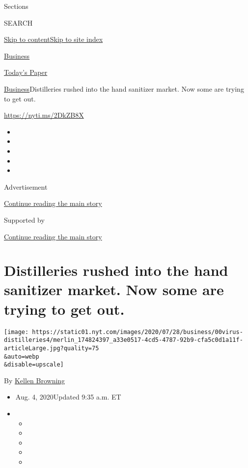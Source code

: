 Sections

SEARCH

\protect\hyperlink{site-content}{Skip to
content}\protect\hyperlink{site-index}{Skip to site index}

\href{https://www.nytimes.com/section/business}{Business}

\href{https://myaccount.nytimes.com/auth/login?response_type=cookie\&client_id=vi}{}

\href{https://www.nytimes.com/section/todayspaper}{Today's Paper}

\href{/section/business}{Business}\textbar{}Distilleries rushed into the
hand sanitizer market. Now some are trying to get out.

\url{https://nyti.ms/2DkZB8X}

\begin{itemize}
\item
\item
\item
\item
\item
\end{itemize}

Advertisement

\protect\hyperlink{after-top}{Continue reading the main story}

Supported by

\protect\hyperlink{after-sponsor}{Continue reading the main story}

\hypertarget{distilleries-rushed-into-the-hand-sanitizer-market-now-some-are-trying-to-get-out}{%
\section{Distilleries rushed into the hand sanitizer market. Now some
are trying to get
out.}\label{distilleries-rushed-into-the-hand-sanitizer-market-now-some-are-trying-to-get-out}}

\texttt{[image: https://static01.nyt.com/images/2020/07/28/business/00virus-distilleries4/merlin\_174824397\_a33e0517-4cd5-4787-92b9-cfa5c0d1a11f-articleLarge.jpg?quality=75\\\&auto=webp\\\&disable=upscale]}

By \href{https://www.nytimes.com/by/kellen-browning}{Kellen Browning}

\begin{itemize}
\item
  Aug. 4, 2020Updated 9:35 a.m. ET
\item
  \begin{itemize}
  \item
  \item
  \item
  \item
  \item
  \end{itemize}
\end{itemize}

